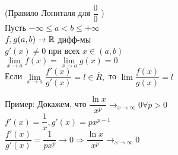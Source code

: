 \begin{theorem}(Правило Лопиталя для $ \dfrac{0}{0} $ )\\
	Пусть $ -\infty \leq a < b \leq +\infty $ \\
	$ f, g (a, b) \rightarrow \mathbb{R} $ дифф-мы \\
	$ g'(x) \neq 0 $ при всех $ x \in (a, b) $\\
	$ \lim\limits_{x \rightarrow a} f(x) = \lim\limits_{x \rightarrow a} g(x) = 0 $ \\
	Если  $ \lim\limits_{x \rightarrow a} \dfrac{f'(x)}{g'(x)} = l \in \overline{R}, $ то $ \lim \dfrac{f(x)}{g(x)} = l $ 
\end{theorem}

Пример: Докажем, что $ \dfrac{\ln x}{x^p} \rightarrow_{x \rightarrow \infty}  0 \forall p > 0 $ \\
$ f'(x) = \dfrac{1}{x}, g'(x) = px^{p-1} $ \\
$ \dfrac{f'(x)}{g'(x)} = \dfrac{1}{px^p} \rightarrow 0 \Rightarrow  \dfrac{\ln x}{x^p} \rightarrow_{x \rightarrow \infty} 0 $\\

















